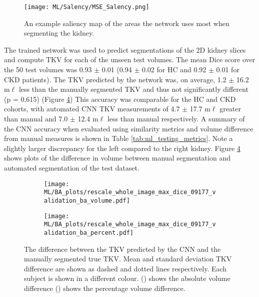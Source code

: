 \begin{figure}[H]
	\centering
	\texttt{[image: ML/Salency/MSE\_Salency.png]}
	\caption{An example saliency map of the areas the network uses most when segmenting the kidney.}
	\label{fig:ml_salency}	
\end{figure}

The trained network was used to predict segmentations of the 2D kidney slices and compute \ac{TKV} for each of the unseen test volumes. The mean Dice score over the 50 test volumes was 0.93 $\pm$ 0.01 (0.94 $\pm$ 0.02 for HC and 0.92 $\pm$ 0.01 for \ac{CKD} patients). The \ac{TKV} predicted by the network was, on average, 1.2 $\pm$ 16.2 m$\ell$ less than the manually segmented \ac{TKV} and thus not significantly different (p = 0.615) (Figure \ref{fig:ml_testing_ba}) This accuracy was comparable for the \ac{HC} and \ac{CKD} cohorts, with automated CNN \ac{TKV} measurements of 4.7 $\pm$ 17.7 m$\ell$ greater than manual and 7.0 $\pm$ 12.4 m$\ell$ less than manual respectively. A summary of the \ac{CNN} accuracy when evaluated using similarity metrics and volume difference from manual measures is shown in Table \ref{tab:ml_testing_metrics}. Note a slightly larger discrepancy for the left compared to the right kidney. Figure \ref{fig:ml_testing_ba} shows plots of the difference in volume between manual segmentation and automated segmentation of the test dataset. 

\begin{figure}[H]
	\centering
	\begin{subfigure}[c]{0.47\textwidth}
		\centering
		\texttt{[image: ML/BA\_plots/rescale\_whole\_image\_max\_dice\_09177\_validation\_ba\_volume.pdf]}
		\caption{}
		\label{fig:ml_testing_ba_volume}
	\end{subfigure}
	\hfill
	\begin{subfigure}[c]{0.47\textwidth}
		\centering
		\texttt{[image: ML/BA\_plots/rescale\_whole\_image\_max\_dice\_09177\_validation\_ba\_percent.pdf]}
		\caption{}
		\label{fig:ml_testing_ba_percent}
	\end{subfigure}
	\caption{The difference between the \ac{TKV} predicted by the \ac{CNN} and the manually segmented true \ac{TKV}. Mean and standard deviation \ac{TKV} difference are shown as dashed and dotted lines respectively. Each subject is shown in a different colour. () shows the absolute volume difference () shows the percentage volume difference.}
	\label{fig:ml_testing_ba}
\end{figure}

